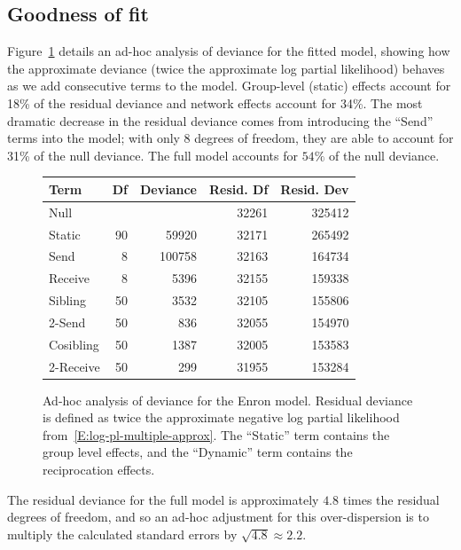 \documentclass[final]{statsoc}
\begin{document}
\subsection{Goodness of fit}\label{S:enron-goodness}

Figure~\ref{F:deviance} details an ad-hoc analysis of deviance for the
fitted model, showing how the approximate deviance (twice the approximate
log partial likelihood) behaves as we add consecutive terms to the model.
Group-level (static) effects account for 18\% of the residual deviance and
network effects account for 34\%.  The most dramatic decrease in the residual
deviance comes from introducing the ``Send'' terms into the model; with only 8
degrees of freedom, they are able to account for 31\% of the null deviance.
The full model accounts for $54\%$ of the null deviance.

\begin{figure}
\centering
\begin{tabular}{lrrrr}
    \toprule
    \textbf{Term}
        & \textbf{Df}
        & \textbf{Deviance}
        & \textbf{Resid. Df}
        & \textbf{Resid. Dev} \\
    \midrule
    Null &  &  & 32261 & 325412 \\
    Static & 90 & 59920 & 32171 & 265492 \\
    Send & 8 & 100758 & 32163 & 164734 \\
    Receive & 8 & 5396 & 32155 & 159338 \\
    Sibling & 50 & 3532 & 32105 & 155806 \\
    2-Send & 50 & 836 & 32055 & 154970 \\
    Cosibling & 50 & 1387 & 32005 & 153583 \\
    2-Receive & 50 & 299 & 31955 & 153284 \\
    \bottomrule
\end{tabular}
    \caption{
        Ad-hoc analysis of deviance for the Enron model.  Residual deviance
        is defined as twice the approximate negative log partial likelihood
        from~\eqref{E:log-pl-multiple-approx}.
        The ``Static'' term contains the group level effects, and the
        ``Dynamic'' term contains the reciprocation effects.
    }
    \label{F:deviance}
\end{figure}

The residual deviance for the full model is approximately $4.8$ times the
residual degrees of freedom, and so an ad-hoc adjustment for this over-dispersion
is to multiply the calculated standard errors by $\sqrt{4.8} \approx 2.2$.
\end{document}
